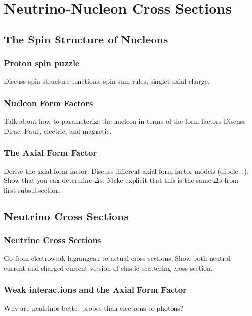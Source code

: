 \section{Neutrino-Nucleon Cross Sections} \label{theory}
\hspace{\parindent}

\subsection{The Spin Structure of Nucleons}
  \subsubsection{Proton spin puzzle}
    Discuss spin structure functions, spin sum rules, singlet axial charge.
  \subsubsection{Nucleon Form Factors}
    Talk about how to parameterize the nucleon in terms of the form factors
    Discuss Dirac, Pauli, electric, and magnetic.
  \subsubsection{The Axial Form Factor}
    Derive the axial form factor. Discuss different axial form factor models
    (dipole...). Show that you can determine $\Delta s$. Make explicit that
    this is the same $\Delta s$ from first subsubsection.
  

\subsection{Neutrino Cross Sections}\label{probe}
  \subsubsection{Neutrino Cross Sections}
    Go from electroweak lagrangean to actual cross sections. Show both
    neutral-current and charged-current version of elastic scattering cross
    section.
  \subsubsection{Weak interactions and the Axial Form Factor}
    Why are neutrinos better probes than electrons or photons?


